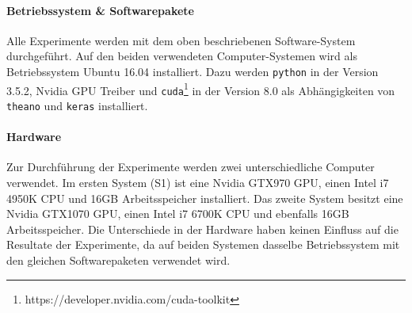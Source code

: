 \paragraph{Betriebssystem \& Softwarepakete}
\label{technical_setup:software}
Alle Experimente werden mit dem oben beschriebenen Software-System durchgeführt. Auf den beiden verwendeten Computer-Systemen wird als Betriebssystem Ubuntu 16.04 installiert. Dazu werden \texttt{python} in der Version 3.5.2, Nvidia GPU Treiber und \texttt{cuda}\footnote{https://developer.nvidia.com/cuda-toolkit} in der Version 8.0 als Abhängigkeiten von \texttt{theano} und \texttt{keras} installiert.

\paragraph{Hardware}
\label{technichal_setup:hardware}
Zur Durchführung der Experimente werden zwei unterschiedliche Computer verwendet. Im ersten System (S1) ist eine Nvidia GTX970 GPU, einen Intel i7 4950K CPU und 16GB Arbeitsspeicher installiert. Das zweite System besitzt eine Nvidia GTX1070 GPU, einen Intel i7 6700K 
CPU und ebenfalls 16GB Arbeitsspeicher. Die Unterschiede in der Hardware haben keinen Einfluss auf die Resultate der Experimente, da auf beiden Systemen dasselbe Betriebssystem mit den gleichen Softwarepaketen verwendet wird.
\fi